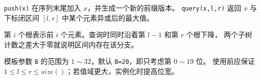 \texttt{push(x)} 在序列末尾加入 $x$，并生成一个新的前缀版本。
\texttt{query(x,l,r)} 返回 $x$ 与下标闭区间 $[l,r]$ 中某个元素异或后的最大值。

第 $i$ 个根表示前 $i$ 个元素。查询时同时沿着第 $l-1$ 和第 $r$ 个根下降，
两个子树计数之差大于零就说明区间内存在该分支。

\begin{icpcwarning}[位宽与空区间]
  模板参数 \texttt{B} 的范围为 $1\sim32$，默认 \texttt{B=20}，即只考虑第 $0\sim19$ 位。
  使用前应保证 $1\le l\le r\le size()$；若值域更大，实例化时提高位宽。
\end{icpcwarning}
